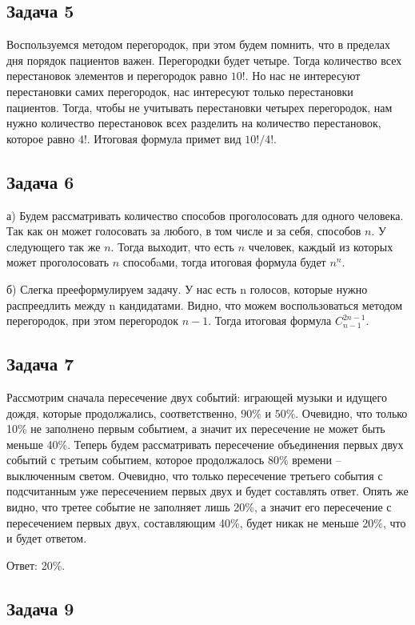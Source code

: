 	\subsection{Задача 5}
	Воспользуемся методом перегородок, при этом будем помнить, что в пределах дня порядок пациентов важен. Перегородки будет четыре. Тогда количество всех перестановок элементов и перегородок равно $10!$.
	Но нас не интересуют перестановки самих перегородок, нас интересуют только перестановки пациентов. Тогда, чтобы не учитывать перестановки четырех перегородок, нам нужно количество перестановок всех разделить на количество перестановок, которое равно $4!$.
	Итоговая формула примет вид $10!/4!$.
	
	\subsection{Задача 6}
	
	а) Будем рассматривать количество способов проголосовать для одного человека. Так как он может голосовать за любого, в том числе и за себя, способов $n$. У следующего так же $n$. Тогда выходит, что есть $n$ ччеловек, каждый из которых может проголосовать $n$ способaми, тогда итоговая формула будет $n^n$.

	б) Слегка прееформулируем задачу. У нас есть n голосов, которые нужно распреедлить между n кандидатами. Видно, что можем воспользоваться методом перегородок, при этом перегородок $n-1$.
	Тогда итоговая формула $C_{n-1}^{2n-1}$.
	
	\subsection{Задача 7}
	Рассмотрим сначала пересечение двух событий: играющей музыки и идущего дождя, которые продолжались, соответственно, $90\%$ и $50\%$. Очевидно, что только 10\% не заполнено первым событием, а значит их пересечение не может быть меньше 40\%.
	Теперь будем рассматривать пересечение объединения первых двух событий с третьим событием, которое продолжалось 80\% времени -- выключенным светом. Очевидно, что только пересечение третьего события с подсчитанным уже пересечением первых двух и будет составлять ответ.
	Опять же видно, что третее событие не заполняет лишь 20\%, а значит его пересечение с пересечением первых двух, составляющим 40\%, будет никак не меньше 20\%, что и будет ответом. 
	
	Ответ: 20\%. 	
	
	\subsection{Задача 9}
	

